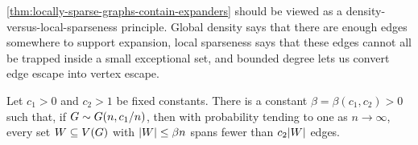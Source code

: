 \cref{thm:locally-sparse-graphs-contain-expanders} should be viewed as a density-versus-local-sparseness principle. Global density says that there are enough edges somewhere to support expansion, local sparseness says that these edges cannot all be trapped inside a small exceptional set, and bounded degree lets us convert edge escape into vertex escape.

\begin{proposition}
	\label{prop:sparse-random-graphs-locally-sparse}
	Let \(c_1>0\) and \(c_2>1\) be fixed constants. There is a constant \(\beta=\beta(c_1,c_2)>0\) such that, if \(G\sim G(n,c_1/n)\), then with probability tending to one as \(n\to\infty\), every set \(W\subseteq V(G)\) with \(\lvert W\rvert\leq \beta n\) spans fewer than \(c_2\lvert W\rvert\) edges.
\end{proposition}

